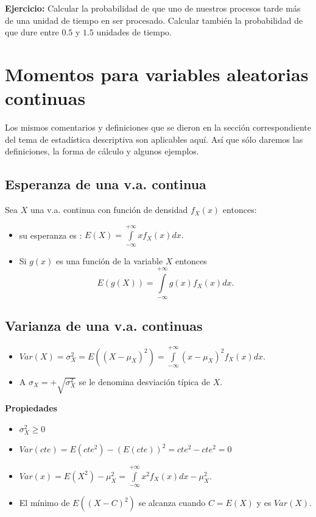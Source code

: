 \documentclass[handout]{beamer}\usepackage[]{graphicx}\usepackage[]{color}
\renewcommand{\geq}{\geqslant}
\theoremstyle{plain}
\theoremstyle{definition}
\begin{document}
\begin{frame}
\textbf{Ejercicio:} Calcular la probabilidad de que uno de nuestros procesos tarde
más de una unidad de tiempo en ser procesado. Calcular también la  probabilidad de
que dure entre $0.5$ y $1.5$ unidades de tiempo.
\end{frame}
\section{Momentos para variables aleatorias continuas}
\begin{frame}
Los mismos comentarios y definiciones que se dieron en la sección correspondiente del tema
de estadística descriptiva %
son aplicables aquí. Así que sólo daremos las
definiciones, la forma de cálculo y algunos ejemplos.
\end{frame}

\subsection{Esperanza de  una v.a. continua}


\begin{frame}
Sea $X$ una v.a. continua con función de densidad $f_{X}(x)$
entonces:

\begin{itemize}
\item su esperanza es :
$E(X)=\int\limits_{-\infty}^{+\infty} xf_{X}(x)dx.$
\item Si $g(x)$ es una función de la variable $X$ entonces
$$E(g(X))=\int\limits_{-\infty}^{+\infty} g(x)f_{X}(x)dx.$$
\end{itemize}
\end{frame}

\subsection{Varianza  de una  v.a. continuas}

\begin{frame}
\begin{itemize}
\item $Var(X)=\sigma_{X}^{2}=E((X-\mu_{X})^2)=
\int\limits_{-\infty}^{+\infty} (x-\mu_{X})^2 f_{X}(x)dx.$
\item A $\sigma_{X}=+\sqrt{\sigma_{X}^{2}}$ se le denomina desviación típica  de $X$.
\end{itemize}
\end{frame}
\begin{frame}



\textbf{Propiedades}
\begin{itemize}
\item $\sigma_{X}^{2}\geq 0$
\item $Var(cte)=E(cte^2)-(E(cte))^2= cte^2 - cte^2=0$
\item $Var(x)=E(X^{2})-\mu_{X}^2=\int\limits_{-\infty}^{+\infty}x^2
f_{X}(x)dx - \mu_{X}^2.$
\item El mínimo de $E((X-C)^2)$ se alcanza cuando $C=E(X)$ y es $Var(X)$.
\end{itemize}
\end{frame}
\end{document}
